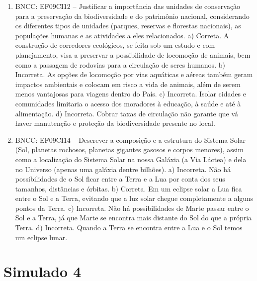\begin{enumerate}
\item
BNCC: EF09CI12 -- Justificar a importância das
unidades de conservação para a preservação da biodiversidade e do
patrimônio nacional, considerando os diferentes tipos de unidades
(parques, reservas e florestas nacionais), as populações humanas e as
atividades a eles relacionados.
a)  Correta. A construção de corredores ecológicos, se feita sob um
  estudo e com planejamento, visa a preservar a possibilidade de locomoção
  de animais, bem como a passagem de rodovias para a circulação de seres humanos.
b)  Incorreta. As opções de locomoção por vias aquáticas e aéreas também geram
  impactos ambientais e colocam em risco a vida de animais, além de
  serem menos vantajosas para viagens dentro do País.
c)  Incorreta. Isolar cidades e comunidades limitaria o acesso dos moradores à educação, à saúde e até à alimentação.
d)  Incorreta. Cobrar taxas de circulação não garante que vá haver
  manutenção e proteção da biodiversidade presente no local.

\item
BNCC: EF09CI14 -- Descrever a composição e a
estrutura do Sistema Solar (Sol, planetas rochosos, planetas gigantes
gasosos e corpos menores), assim como a localização do Sistema Solar na
nossa Galáxia (a Via Láctea) e dela no Universo (apenas uma galáxia
dentre bilhões).
a)  Incorreta. Não há possibilidades de o Sol ficar entre a Terra e a
  Lua por conta dos seus tamanhos, distâncias e órbitas.
b)  Correta. Em um eclipse solar a Lua fica entre o Sol e a Terra, evitando que a luz solar chegue completamente a alguns pontos da Terra.
c)  Incorreta. Não há possibilidades de Marte passar entre o Sol e a
  Terra, já que Marte se encontra mais distante do Sol do que a própria Terra.
d)  Incorreta. Quando a Terra se encontra entre a Lua e o Sol temos um eclipse lunar.

\end{enumerate}

\section*{Simulado 4}

